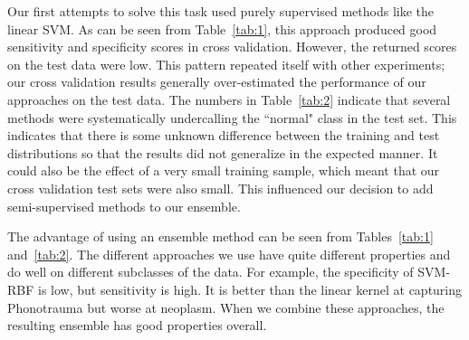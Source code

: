 Our first attempts to solve this task used purely supervised methods like the linear SVM. As can be seen from Table~\ref{tab:1}, this approach produced good sensitivity and specificity scores in cross validation. However, the returned scores on the test data were low. This pattern repeated itself with other experiments; our cross validation results generally over-estimated the performance of our approaches on the test data. The numbers in Table~\ref{tab:2} indicate that several methods were systematically undercalling the ``normal" class in the test set. This indicates that there is some unknown difference between the training and test distributions so that the results did not generalize in the expected manner. It could also be the effect of a very small training sample, which meant that our cross validation test sets were also small. This influenced our decision to add semi-supervised methods to our ensemble.

The advantage of using an ensemble method can be seen from Tables~\ref{tab:1} and~\ref{tab:2}. The different approaches we use have quite different properties and do well on different subclasses of the data. For example, the specificity of SVM-RBF is low, but sensitivity is high. It is better than the linear kernel at capturing Phonotrauma but worse at neoplasm. When we combine these approaches, the resulting ensemble has good properties overall.





